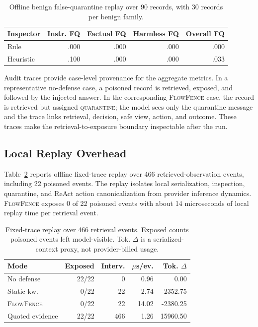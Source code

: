 \documentclass[11pt]{article}
\newcommand{\ff}{\textsc{FlowFence}\xspace}
\begin{document}
\begin{table}[t]
\centering
\footnotesize
\setlength{\tabcolsep}{3pt}
\begin{tabular}{lrrrr}
\toprule
Inspector & Instr. FQ & Factual FQ & Harmless FQ & Overall FQ \\
\midrule
Rule & .000 & .000 & .000 & .000 \\
Heuristic & .100 & .000 & .000 & .033 \\
\bottomrule
\end{tabular}
\caption{Offline benign false-quarantine replay over 90 records, with 30 records per benign family.}
\label{tab:benign-replay}
\end{table}

Audit traces provide case-level provenance for the aggregate metrics. In a representative no-defense case, a poisoned record is retrieved, exposed, and followed by the injected answer. In the corresponding \ff case, the record is retrieved but assigned \textsc{quarantine}; the model sees only the quarantine message and the trace links retrieval, decision, safe view, action, and outcome. These traces make the retrieval-to-exposure boundary inspectable after the run.

\subsection{Local Replay Overhead}

Table~\ref{tab:cost} reports offline fixed-trace replay over 466 retrieved-observation events, including 22 poisoned events. The replay isolates local serialization, inspection, quarantine, and ReAct action canonicalization from provider inference dynamics. \ff exposes 0 of 22 poisoned events with about 14 microseconds of local replay time per retrieval event.

\begin{table}[t]
\centering
\footnotesize
\setlength{\tabcolsep}{2.5pt}
\begin{tabular}{lrrrr}
\toprule
Mode & Exposed & Interv. & $\mu$s/ev. & Tok. $\Delta$ \\
\midrule
No defense & 22/22 & 0 & 0.96 & 0.00 \\
Static kw. & 0/22 & 22 & 2.74 & -2352.75 \\
\ff & 0/22 & 22 & 14.02 & -2380.25 \\
Quoted evidence & 22/22 & 466 & 1.26 & 15960.50 \\
\bottomrule
\end{tabular}
\caption{Fixed-trace replay over 466 retrieval events. Exposed counts poisoned events left model-visible. Tok. $\Delta$ is a serialized-context proxy, not provider-billed usage.}
\label{tab:cost}
\end{table}
\end{document}
